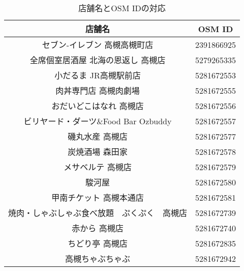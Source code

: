   \begin{table}[tb]
    \caption{店舗名とOSM IDの対応}
    \label{table:storename_to_osmid}
    \begin{center}
      \begin{tabular}{c|c}
        \hline\hline
        店舗名 & OSM ID \\ 
        \hline
        セブン-イレブン 高槻高槻町店 & 2391866925 \\
        全席個室居酒屋 北海の恩返し 高槻店 & 5279265335 \\
        小だるま JR高槻駅前店 & 5281672553 \\
        肉丼専門店 高槻肉劇場 & 5281672555 \\
        おだいどこはなれ 高槻店 & 5281672556 \\
        ビリヤード・ダーツ\&Food Bar Ozbuddy & 5281672557 \\
        磯丸水産 高槻店 & 5281672577 \\
        炭焼酒場 森田家 & 5281672578 \\
        メサベルテ 高槻店 & 5281672579 \\
        駿河屋 & 5281672580 \\
        甲南チケット 高槻本通店 & 5281672581 \\
        焼肉・しゃぶしゃぶ食べ放題　ぷくぷく　高槻店 & 5281672739 \\
        赤から 高槻店 & 5281672740 \\
        ちどり亭 高槻店 & 5281672835 \\
        高槻ちゃぶちゃぶ & 5281672942 \\
        \hline
      \end{tabular}
    \end{center}


\end{table}
